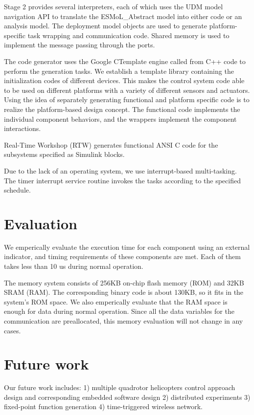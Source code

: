 \documentclass[10pt, conference, compsocconf]{IEEEtran}
\begin{document}
Stage 2 provides several interpreters, each of which uses the UDM model navigation API to translate the ESMoL\_Abstract model into either code or an analysis model. The deployment model objects are used to generate platform-specific task wrapping and communication code. Shared memory is used to implement the message passing through the ports.

The code generator uses the Google CTemplate engine called from C++ code to perform the generation tasks. We establish a template library containing the initialization codes of different devices. This makes the control system code able to be used on different platforms with a variety of different sensors and actuators. Using the idea of separately generating functional and platform specific code is to realize the platform-based design concept. The functional code implements the individual component behaviors, and the wrappers implement the component interactions.

Real-Time Workshop (RTW) generates functional ANSI C code for the subsystems specified as Simulink blocks.

Due to the lack of an operating system, we use interrupt-based multi-tasking. The timer interrupt service routine invokes the tasks according to the specified schedule.


\section{Evaluation}

We emperically evaluate the execution time for each component using an external indicator, and timing requirements of these components are met. Each of them takes less than 10 us during normal operation.

The memory system consists of 256KB on-chip flash memory (ROM) and 32KB SRAM (RAM). The corresponding binary code is about 130KB, so it fits in the system's ROM space. We also emperically evaluate that the RAM space is enough for data during normal operation. Since all the data variables for the communication are preallocated, this memory evaluation will not change in any cases.

\section{Future work}

Our future work includes: 1) multiple quadrotor helicopters control approach design and corresponding embedded software design 2) distributed experiments 3) fixed-point function generation 4) time-triggered wireless network.
\end{document}
